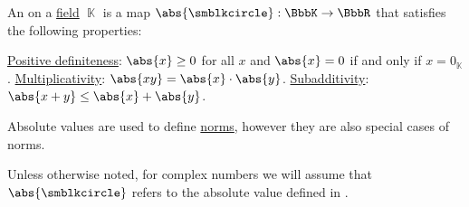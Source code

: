 \begin{definition}\label{def:absolute_value}
  An  on a \hyperref[def:field]{field} \( \BbbK \) is a map \( \abs{\anon}: \BbbK \to \BbbR \) that satisfies the following properties:
  \begin{thmenum}
     \hyperref[def:real_function_definiteness]{Positive definiteness}: \( \abs{x} \geq 0 \) for all \( x \) and \( \abs{x} = 0 \) if and only if \( x = 0_\BbbK \).
     \hyperref[def:multiplicative_function]{Multiplicativity}: \( \abs{xy} = \abs{x} \cdot \abs{y} \).
     \hyperref[def:additive_function/sub]{Subadditivity}: \( \abs{x + y} \leq \abs{x} + \abs{y} \).
  \end{thmenum}
\end{definition}
\begin{comments}
  \item Absolute values are used to define \hyperref[def:norm]{norms}, however they are also special cases of norms.
  \item Unless otherwise noted, for complex numbers we will assume that \( \abs{\anon} \) refers to the absolute value defined in .
\end{comments}

